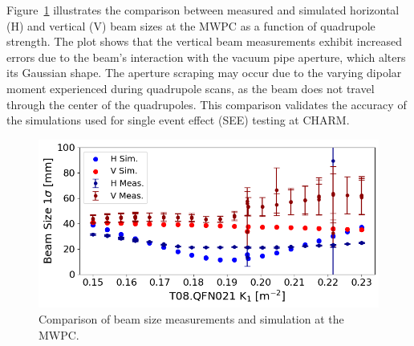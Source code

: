 \documentclass[a4paper,
               biblatex,     %
               ]{jacow}
\begin{document}
Figure~\ref{fig:diff_beam_size} illustrates the comparison between measured and simulated horizontal (H) and vertical (V) beam sizes at the MWPC as a function of quadrupole strength. The plot shows that the vertical beam measurements exhibit increased errors due to the beam's interaction with the vacuum pipe aperture, which alters its Gaussian shape. The aperture scraping may occur due to the varying dipolar moment experienced during quadrupole scans, as the beam does not travel through the center of the quadrupoles. This comparison validates the accuracy of the simulations used for single event effect (SEE) testing at CHARM. 

\begin{figure}[!htb]
   \centering
   \includegraphics*[width=1.0\columnwidth]{THPR032_f4.png}
   \caption{Comparison of beam size measurements and simulation at the MWPC.}
   \label{fig:diff_beam_size}
\end{figure}








\end{document}
